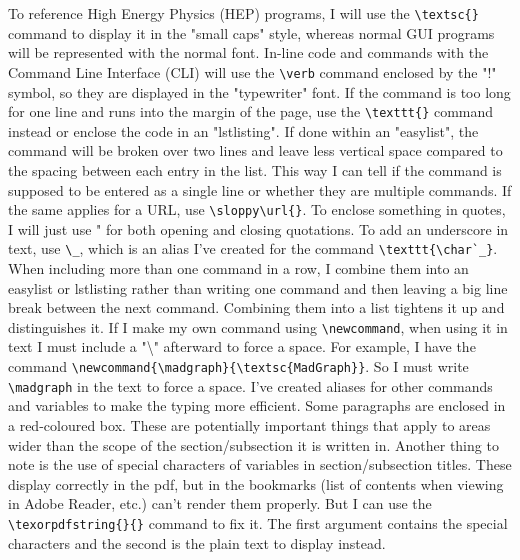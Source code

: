 To reference High Energy Physics (HEP) programs, I will use the \verb!\textsc{}! command to display it in the "small caps" style, whereas normal GUI programs will be represented with the normal font. In-line code and commands with the Command Line Interface (CLI) will use the \verb!\verb! command enclosed by the "!" symbol, so they are displayed in the "typewriter" font. If the command is too long for one line and runs into the margin of the page, use the \verb!\texttt{}! command instead or enclose the code in an "lstlisting". If done within an "easylist", the command will be broken over two lines and leave less vertical space compared to the spacing between each entry in the list. This way I can tell if the command is supposed to be entered as a single line or whether they are multiple commands. If the same applies for a URL, use \verb!\sloppy\url{}!. To enclose something in quotes, I will just use " for both opening and closing quotations. To add an underscore in text, use \verb!\_!, which is an alias I've created for the command \verb!\texttt{\char`_}!. When including more than one command in a row, I combine them into an easylist or lstlisting rather than writing one command and then leaving a big line break between the next command. Combining them into a list tightens it up and distinguishes it. If I make my own command using \verb!\newcommand!, when using it in text I must include a "\textbackslash" afterward to force a space. For example, I have the command \verb!\newcommand{\madgraph}{\textsc{MadGraph}}!. So I must write \verb!\madgraph! in the text to force a space. I've created aliases for other commands and variables to make the typing more efficient. Some paragraphs are enclosed in a red-coloured box. These are potentially important things that apply to areas wider than the scope of the section/subsection it is written in. Another thing to note is the use of special characters of variables in section/subsection titles. These display correctly in the pdf, but in the bookmarks (list of contents when viewing in Adobe Reader, etc.) can't render them properly. But I can use the \verb!\texorpdfstring{}{}! command to fix it. The first argument contains the special characters and the second is the plain text to display instead.

